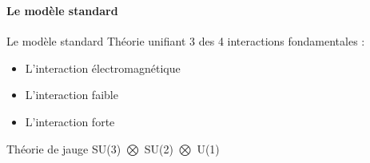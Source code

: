 \documentclass[8pt]{beamer}
\begin{document}
  \begin{frame}
  \frametitle{\secname}
  \framesubtitle{Le modèle standard}
    \begin{minipage}{0.6\linewidth}
      \begin{block}{Le modèle standard}
        Théorie unifiant 3 des 4 interactions fondamentales :
        \begin{itemize}
          \item L'interaction électromagnétique
          \item L'interaction faible
          \item L'interaction forte
        \end{itemize}
        Théorie de jauge SU(3) $\bigotimes$ SU(2) $\bigotimes$ U(1)
      \end{block}
    \end{minipage} \hfill
    \begin{minipage}{0.38\linewidth}
    \end{minipage}
    \begin{minipage}{0.48\linewidth}
      \begin{tikzpicture}

\end{tikzpicture}
\end{minipage}
\end{frame}
\end{document}
